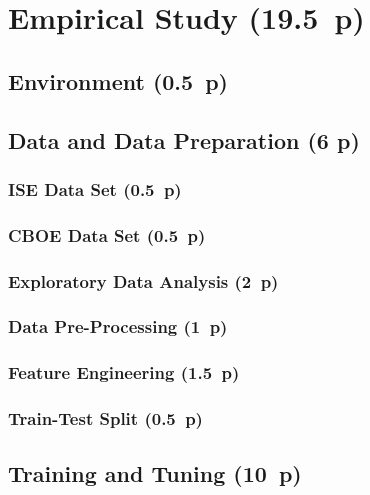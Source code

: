 \newpage
\section{Empirical Study (19.5~p)}\label{sec:empirical-study}

\subsection{Environment (0.5~p)}\label{sec:environment}

\subsection{Data and Data Preparation (6 p)}\label{sec:data-and-data-preparation}

\subsubsection{ISE Data Set (0.5~p)}\label{sec:ise-data-set}

\subsubsection{CBOE Data Set (0.5~p)}\label{sec:cboe-data-set}

\subsubsection{Exploratory Data Analysis (2~p)}\label{sec:exploratory-data-analysis}

\subsubsection{Data Pre-Processing (1~p)}\label{sec:data-preprocessing}

\subsubsection{Feature Engineering (1.5~p)}\label{sec:feature-engineering}

\subsubsection{Train-Test Split (0.5~p)}\label{sec:train-test-split}

\subsection{Training and Tuning (10~p)}\label{sec:training-and-tuning}

